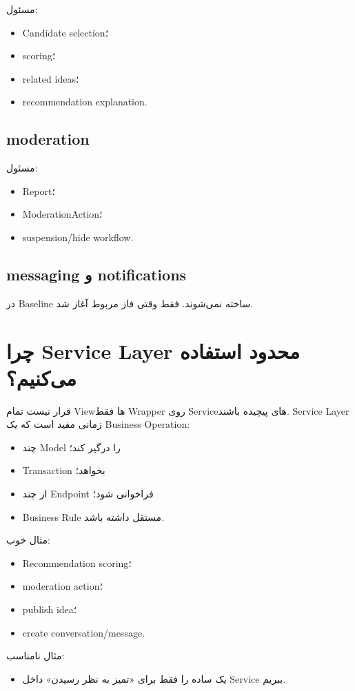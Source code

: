 مسئول:
\begin{itemize}
  \item Candidate selection؛
  \item scoring؛
  \item related ideas؛
  \item recommendation explanation.
\end{itemize}

\subsection{moderation}

مسئول:
\begin{itemize}
  \item Report؛
  \item ModerationAction؛
  \item suspension/hide workflow.
\end{itemize}

\subsection{messaging و notifications}

در Baseline ساخته نمی‌شوند. فقط وقتی فاز مربوط آغاز شد.

\section{چرا Service Layer محدود استفاده می‌کنیم؟}

قرار نیست تمام Viewها فقط Wrapper روی Serviceهای پیچیده باشند. Service Layer زمانی مفید است که یک Business Operation:
\begin{itemize}
  \item چند Model را درگیر کند؛
  \item Transaction بخواهد؛
  \item از چند Endpoint فراخوانی شود؛
  \item Business Rule مستقل داشته باشد.
\end{itemize}

مثال خوب:
\begin{itemize}
  \item Recommendation scoring؛
  \item moderation action؛
  \item publish idea؛
  \item create conversation/message.
\end{itemize}

مثال نامناسب:
\begin{itemize}
  \item یک  ساده را فقط برای «تمیز به نظر رسیدن» داخل Service ببریم.
\end{itemize}

